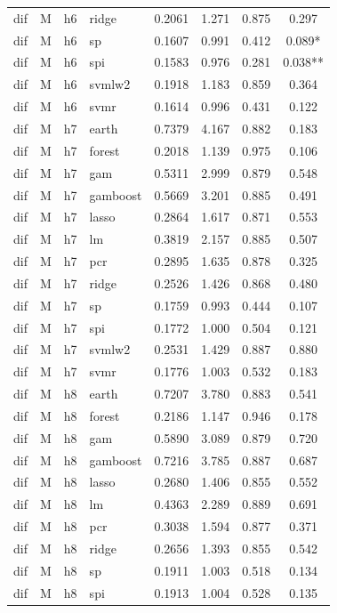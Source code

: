 \begin{ThreePartTable}
\begin{longtable}[t]{llclcccc}
dif & M & h6 & ridge & 0.2061 & 1.271 & 0.875 & 0.297\\
dif & M & h6 & sp & 0.1607 & 0.991 & 0.412 & 0.089*\\
dif & M & h6 & spi & 0.1583 & 0.976 & 0.281 & 0.038**\\
dif & M & h6 & svmlw2 & 0.1918 & 1.183 & 0.859 & 0.364\\
dif & M & h6 & svmr & 0.1614 & 0.996 & 0.431 & 0.122\\
\addlinespace
dif & M & h7 & earth & 0.7379 & 4.167 & 0.882 & 0.183\\
dif & M & h7 & forest & 0.2018 & 1.139 & 0.975 & 0.106\\
dif & M & h7 & gam & 0.5311 & 2.999 & 0.879 & 0.548\\
dif & M & h7 & gamboost & 0.5669 & 3.201 & 0.885 & 0.491\\
dif & M & h7 & lasso & 0.2864 & 1.617 & 0.871 & 0.553\\
dif & M & h7 & lm & 0.3819 & 2.157 & 0.885 & 0.507\\
dif & M & h7 & pcr & 0.2895 & 1.635 & 0.878 & 0.325\\
dif & M & h7 & ridge & 0.2526 & 1.426 & 0.868 & 0.480\\
dif & M & h7 & sp & 0.1759 & 0.993 & 0.444 & 0.107\\
dif & M & h7 & spi & 0.1772 & 1.000 & 0.504 & 0.121\\
dif & M & h7 & svmlw2 & 0.2531 & 1.429 & 0.887 & 0.880\\
dif & M & h7 & svmr & 0.1776 & 1.003 & 0.532 & 0.183\\
\addlinespace
dif & M & h8 & earth & 0.7207 & 3.780 & 0.883 & 0.541\\
dif & M & h8 & forest & 0.2186 & 1.147 & 0.946 & 0.178\\
dif & M & h8 & gam & 0.5890 & 3.089 & 0.879 & 0.720\\
dif & M & h8 & gamboost & 0.7216 & 3.785 & 0.887 & 0.687\\
dif & M & h8 & lasso & 0.2680 & 1.406 & 0.855 & 0.552\\
dif & M & h8 & lm & 0.4363 & 2.289 & 0.889 & 0.691\\
dif & M & h8 & pcr & 0.3038 & 1.594 & 0.877 & 0.371\\
dif & M & h8 & ridge & 0.2656 & 1.393 & 0.855 & 0.542\\
dif & M & h8 & sp & 0.1911 & 1.003 & 0.518 & 0.134\\
dif & M & h8 & spi & 0.1913 & 1.004 & 0.528 & 0.135\\

\end{longtable}
\end{ThreePartTable}
